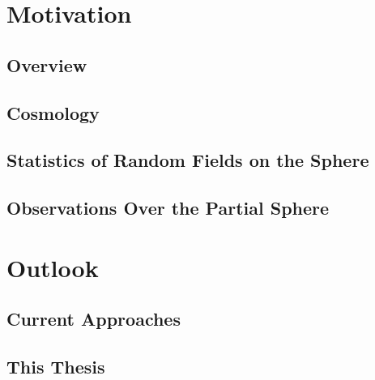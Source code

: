





\section{Motivation}

\subsection{Overview}

\subsection{Cosmology}





\subsection{Statistics of Random Fields on the Sphere}

\subsection{Observations Over the Partial Sphere}

\section{Outlook}

\subsection{Current Approaches}

\subsection{This Thesis}
